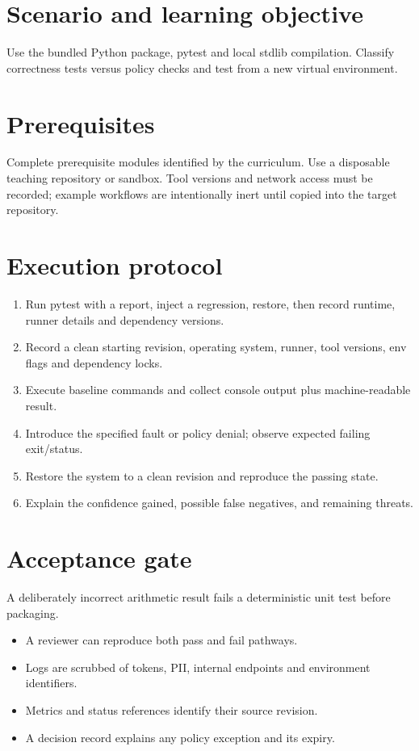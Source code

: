 \documentclass[11pt,letterpaper]{article}
\begin{document}
\makedoctitle
\makedocsummary
\tableofcontents
\clearpage
\section{Scenario and learning objective}
Use the bundled Python package, pytest and local stdlib compilation. Classify correctness tests versus policy checks and test from a new virtual environment.

\section{Prerequisites}
Complete prerequisite modules identified by the curriculum. Use a disposable teaching repository or sandbox. Tool versions and network access must be recorded; example workflows are intentionally inert until copied into the target repository.

\section{Execution protocol}
\begin{enumerate}
\item Run pytest with a report, inject a regression, restore, then record runtime, runner details and dependency versions.
\item Record a clean starting revision, operating system, runner, tool versions, env flags and dependency locks.
\item Execute baseline commands and collect console output plus machine-readable result.
\item Introduce the specified fault or policy denial; observe expected failing exit/status.
\item Restore the system to a clean revision and reproduce the passing state.
\item Explain the confidence gained, possible false negatives, and remaining threats.
\end{enumerate}
\section{Acceptance gate}
A deliberately incorrect arithmetic result fails a deterministic unit test before packaging.

\begin{itemize}
\item A reviewer can reproduce both pass and fail pathways.
\item Logs are scrubbed of tokens, PII, internal endpoints and environment identifiers.
\item Metrics and status references identify their source revision.
\item A decision record explains any policy exception and its expiry.
\end{itemize}
\end{document}
